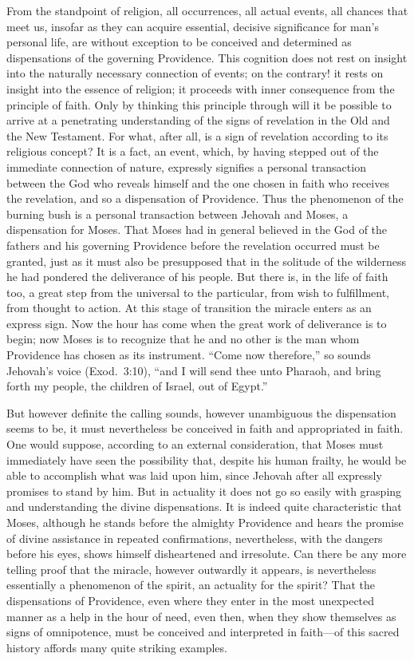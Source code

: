 \documentclass[12pt]{book}
\newcommand{\opage}[1]{\marginnote{\footnotesize\textit{[#1]}}}
\begin{document}
From the standpoint of religion, all occurrences, all actual events, all
chances that meet us, insofar as they can acquire essential, decisive
significance for man's personal life, are without exception to be
conceived and determined as dispensations of the governing Providence.
This cognition does not rest on insight into the naturally necessary
connection of events; on the contrary! it rests on insight into the
essence of religion; it proceeds with inner consequence from the
principle of faith. Only by thinking this principle through will it be
possible to arrive at a penetrating understanding of the signs of
revelation in the Old and the New Testament. For what, after all, is a
sign of revelation according to its religious concept? It is a fact, an
event, which, by having stepped out of the immediate connection of
nature, expressly signifies a personal transaction between the God who
reveals himself and the one chosen in faith who receives the revelation,
and so a dispensation of
\opage{214}\setcounter{footnote}{0}%
Providence. Thus the phenomenon of the burning bush is a personal
transaction between Jehovah and Moses, a dispensation for Moses. That
Moses had in general believed in the God of the fathers and his
governing Providence before the revelation occurred must be granted,
just as it must also be presupposed that in the solitude of the
wilderness he had pondered the deliverance of his people. But there is,
in the life of faith too, a great step from the universal to the
particular, from wish to fulfillment, from thought to action. At this
stage of transition the miracle enters as an express sign. Now the hour
has come when the great work of deliverance is to begin; now Moses is to
recognize that he and no other is the man whom Providence has chosen as
its instrument. ``Come now therefore,'' so sounds Jehovah's voice
(Exod.~3:10), ``and I will send thee unto Pharaoh, and bring forth my
people, the children of Israel, out of Egypt.''

But however definite the calling sounds, however unambiguous the
dispensation seems to be, it must nevertheless be conceived in faith and
appropriated in faith. One would suppose, according to an external
consideration, that Moses must immediately have seen the possibility
that, despite his human frailty, he would be able to accomplish what was
laid upon him, since Jehovah after all expressly promises to stand by
him. But in actuality it does not go so easily with grasping and
understanding the divine dispensations. It is indeed quite
characteristic that Moses, although he stands before the almighty
Providence and hears the promise of divine assistance in repeated
confirmations, nevertheless, with the dangers before his eyes, shows
himself disheartened and irresolute. Can there be any more telling proof
that the miracle, however outwardly it appears, is nevertheless
essentially a phenomenon of the spirit, an actuality for the spirit?
That the dispensations of Providence, even where they enter in the most
unexpected
\opage{215}\setcounter{footnote}{0}%
manner as a help in the hour of need, even then, when they show
themselves as signs of omnipotence, must be conceived and interpreted in
faith---of this sacred history affords many quite striking examples.
\end{document}
